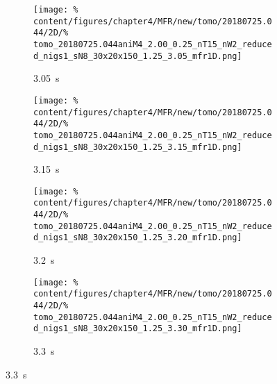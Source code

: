             \begin{figure}[t]%
                \centering%
                \begin{subfigure}{0.45\textwidth}%
                    \centering%
                    \caption{\SI{3.05}{\second}}%
                    \vspace*{-0.1cm}%
                    \texttt{[image: \%
                        content/figures/chapter4/MFR/new/tomo/20180725.044/2D/\%
                        tomo\_20180725.044aniM4\_2.00\_0.25\_nT15\_nW2\_reduced\_nigs1\_sN8\_30x20x150\_1.25\_3.05\_mfr1D.png]}%
                \end{subfigure}%
                \hfill%
                \begin{subfigure}{0.45\textwidth}%
                    \centering%
                    \caption{\SI{3.15}{\second}}%
                    \vspace*{-0.1cm}%
                    \texttt{[image: \%
                        content/figures/chapter4/MFR/new/tomo/20180725.044/2D/\%
                        tomo\_20180725.044aniM4\_2.00\_0.25\_nT15\_nW2\_reduced\_nigs1\_sN8\_30x20x150\_1.25\_3.15\_mfr1D.png]}%
                \end{subfigure}%
                \newline%
                \vspace*{-0.1cm}%
                \begin{subfigure}{0.45\textwidth}%
                    \centering%
                    \caption{\SI{3.2}{\second}}%
                    \vspace*{-0.1cm}%
                    \texttt{[image: \%
                        content/figures/chapter4/MFR/new/tomo/20180725.044/2D/\%
                        tomo\_20180725.044aniM4\_2.00\_0.25\_nT15\_nW2\_reduced\_nigs1\_sN8\_30x20x150\_1.25\_3.20\_mfr1D.png]}%
                \end{subfigure}%
                \hfill%
                \vspace*{-0.1cm}%
                \begin{subfigure}{0.45\textwidth}%
                    \centering%
                    \caption{\SI{3.3}{\second}}%
                    \vspace*{-0.1cm}%
                    \texttt{[image: \%
                        content/figures/chapter4/MFR/new/tomo/20180725.044/2D/\%
                        tomo\_20180725.044aniM4\_2.00\_0.25\_nT15\_nW2\_reduced\_nigs1\_sN8\_30x20x150\_1.25\_3.30\_mfr1D.png]}%
                \end{subfigure}%

\end{figure}

